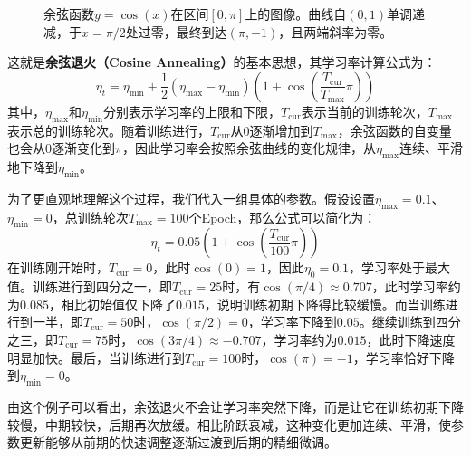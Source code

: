 \begin{figure}[H]
    \caption{余弦函数$y=\cos(x)$在区间$[0,\pi]$上的图像。曲线自$(0,1)$单调递减，于$x=\pi/2$处过零，最终到达$(\pi,-1)$，且两端斜率为零。}
    \label{fig:cosine}
\end{figure}

这就是\textbf{余弦退火（Cosine Annealing）}的基本思想，其学习率计算公式为：
$$
\eta_t = \eta_{\min} + \frac{1}{2}(\eta_{\max} - \eta_{\min})
\left(1 + \cos\left(\frac{T_{\text{cur}}}{T_{\max}}\pi\right)\right)
$$
其中，$\eta_{\max}$和$\eta_{\min}$分别表示学习率的上限和下限，$T_{\text{cur}}$表示当前的训练轮次，$T_{\max}$表示总的训练轮次。随着训练进行，$T_{\text{cur}}$从$0$逐渐增加到$T_{\max}$，余弦函数的自变量也会从$0$逐渐变化到$\pi$，因此学习率会按照余弦曲线的变化规律，从$\eta_{\max}$连续、平滑地下降到$\eta_{\min}$。

为了更直观地理解这个过程，我们代入一组具体的参数。假设设置$\eta_{\max}=0.1$、$\eta_{\min}=0$，总训练轮次$T_{\max}=100$个Epoch，那么公式可以简化为：
$$
\eta_t = 0.05\left(1+\cos\left(\frac{T_{\text{cur}}}{100}\pi\right)\right)
$$
在训练刚开始时，$T_{\text{cur}}=0$，此时$\cos(0)=1$，因此$\eta_0=0.1$，学习率处于最大值。训练进行到四分之一，即$T_{\text{cur}}=25$时，有$\cos(\pi/4)\approx0.707$，此时学习率约为$0.085$，相比初始值仅下降了$0.015$，说明训练初期下降得比较缓慢。而当训练进行到一半，即$T_{\text{cur}}=50$时，$\cos(\pi/2)=0$，学习率下降到$0.05$。继续训练到四分之三，即$T_{\text{cur}}=75$时，$\cos(3\pi/4)\approx-0.707$，学习率约为$0.015$，此时下降速度明显加快。最后，当训练进行到$T_{\text{cur}}=100$时，$\cos(\pi)=-1$，学习率恰好下降到$\eta_{\min}=0$。

由这个例子可以看出，余弦退火不会让学习率突然下降，而是让它在训练初期下降较慢，中期较快，后期再次放缓。相比阶跃衰减，这种变化更加连续、平滑，使参数更新能够从前期的快速调整逐渐过渡到后期的精细微调。

